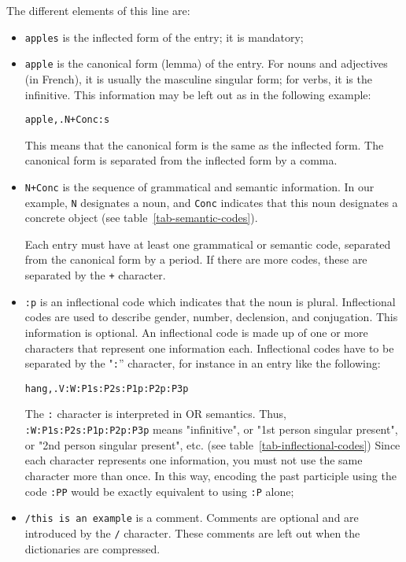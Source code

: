 \bigskip
\noindent The different elements of this line are:

\bigskip
\begin{itemize}
  \item \verb+apples+ is the inflected form of the entry; it is mandatory;
  
  \bigskip \item \verb+apple+ is the canonical form (lemma) of the
  entry. For nouns and adjectives (in French), it is usually the
  masculine singular form; for verbs, it is the infinitive. This information may
  be left out as in the following example:
  
  \bigskip
  \verb$apple,.N+Conc:s$
  
  \bigskip This means that the canonical form is the same as the inflected form.
  The canonical form is separated from the inflected form by a
  comma.\index{\verbc{,}}
  
  \bigskip \item \verb$N+Conc$ is the sequence of grammatical and semantic
  information.  In our
  example, \verb+N+ designates a noun, and \verb+Conc+ indicates that this noun
  designates a concrete object (see table~\ref{tab-semantic-codes}).
  
  Each entry must have at least one grammatical or semantic code, separated from
  the canonical form by a period. If there are more codes, these are separated by
  the \verb$+$\index{\verbc{+}} character.
  
  \bigskip \item \verb+:p+ is an inflectional code which indicates that the noun
  is  plural. Inflectional codes are used to
  describe gender, number, declension, and conjugation. This information is
  optional. An inflectional code is made up of one or more characters that
  represent one information each. Inflectional codes have to be separated by the
  "\verb+:+'' character, for instance in an entry like the following:
  
  \verb+hang,.V:W:P1s:P2s:P1p:P2p:P3p+
  
  The \verb+:+ character is interpreted in OR semantics. Thus,
  \verb+:W:P1s:P2s:P1p:P2p:P3p+ means "infinitive", or "1st person singular
  present", or "2nd person singular present", etc. (see
  table~\ref{tab-inflectional-codes}) Since each character
  represents one information, you must not use the same character
  more than once. In this way, encoding the past participle using the code \verb+:PP+ would be
  exactly equivalent to using \verb+:P+ alone;\index{\verbc{:}}
  
  \bigskip \item \verb+/this is an example+ is a comment. Comments are optional
  and are introduced by the \verb+/+ character. These comments are left out when
  the dictionaries are compressed. 
   \index{\verbc{/}}
\end{itemize}

